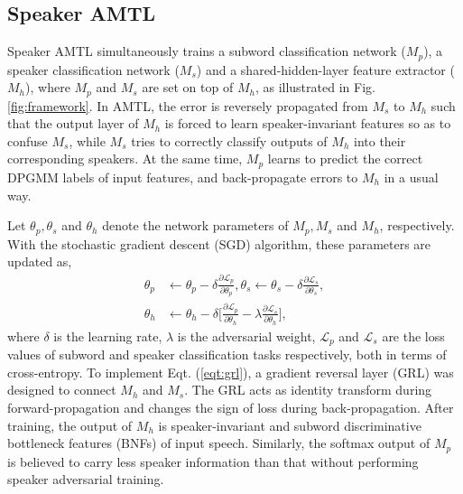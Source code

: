 \documentclass[a4paper]{article}
\begin{document}
\subsection{Speaker AMTL}
\label{subsec:amtl}
Speaker AMTL 
simultaneously trains a subword classification network ($M_p$),
a speaker classification network ($M_s$) and a shared-hidden-layer feature extractor ($M_h$), where $M_p$ and $M_s$ are set on top of $M_h$, as illustrated in Fig. \ref{fig:framework}.
In AMTL, the error is reversely propagated from $M_s$ to $M_h$ such that 
the output layer of  $M_h$ is forced to learn   speaker-invariant features so as to confuse $M_s$, while $M_s$ tries to correctly classify outputs of $M_h$ into their corresponding speakers. At the same time, $M_p$ learns to predict the correct DPGMM labels of input features, and back-propagate errors to $M_h$ in a usual way.

Let $\theta_p, \theta_s$ and $\theta_h$ denote the network parameters of
$M_p, M_s$ and $M_h$, respectively.
With the stochastic gradient descent (SGD) algorithm, these parameters are updated as,
\begin{align}
    \theta_p &\leftarrow \theta_p - \delta\frac{\partial \mathcal{L}_{p}}{\partial \theta_p}, 
    \theta_s  \leftarrow \theta_s - \delta \frac{\partial \mathcal{L}_s}{\partial \theta_s}, \\
    \theta_h & \leftarrow \theta_h -\delta \Big[\frac{\partial \mathcal{L}_p}{\partial \theta_h} - \lambda \frac{\partial \mathcal{L}_s}{\partial \theta_h}\Big], \label{eqt:grl}
\end{align}
where $\delta$ is the learning rate, $\lambda$ is the adversarial weight, $\mathcal{L}_p$ and $\mathcal{L}_s$ are the loss values of subword and speaker classification tasks respectively, both in terms of cross-entropy. To implement Eqt. (\ref{eqt:grl}), a gradient reversal layer (GRL) \cite{ganin2015unsupervised} was designed to connect $M_h$ and $M_s$. The GRL acts as identity transform during forward-propagation and changes the sign of loss  during back-propagation. 
After training, the output of $M_h$ is speaker-invariant and subword discriminative bottleneck features (BNFs) of input speech. Similarly, the softmax output of $M_p$ is believed to carry less speaker information than that without performing speaker adversarial training. 
 
\end{document}
